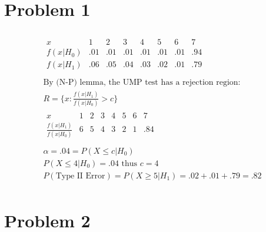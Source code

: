 \documentclass{article}
\begin{document}
\begin{flushleft}

	\section*{Problem 1}
	
\begin{multline*}\\
\begin{array}{r|rrrrrrr}
x&1 & 2 & 3 & 4 & 5 & 6 & 7 \\ \hline 
f(x|H_0)&.01 &.01 & .01 & .01 & .01 & .01 & .94 \\
f(x|H_1)&.06&.05&.04&.03&.02&.01&.79\\
\end{array}\\
\text{By (N-P) lemma, the UMP test has a rejection region:}\\
R=\{x:\frac{f(x|H_1)}{f(x|H_0)}>c\}\\
\begin{array}{r|rrrrrrr}
x&1 & 2 & 3 & 4 & 5 & 6 & 7 \\ \hline 
\frac{f(x|H_1)}{f(x|H_0)}&6 & 5 & 4 & 3 & 2 & 1 & .84 \\
\end{array}\\
\alpha=.04=P(X\leq c|H_0)\\
P(X\leq 4|H_0)=.04 \text{ thus } c=4\\
P(\text{Type II Error})=P(X\geq 5|H_1)=.02+.01+.79=.82\\
\end{multline*}

	\section*{Problem 2}
\begin{enumerate}[(a)]
	

\end{enumerate}
\end{flushleft}
\end{document}
